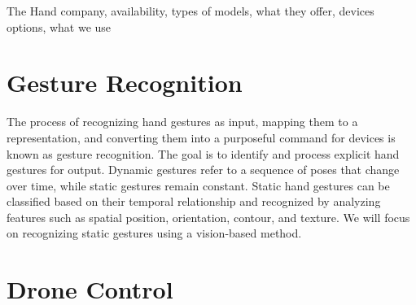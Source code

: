 The Hand 
company, availability, types of models, what they offer, devices options, what we use







\section{Gesture Recognition}

The process of recognizing hand gestures as input, mapping them to a representation, and converting them into a purposeful command for devices is known as gesture recognition. The goal is to identify and process explicit hand gestures for output. 
Dynamic gestures refer to a sequence of poses that change over time, while static gestures remain constant. Static hand gestures can be classified based on their temporal relationship and recognized by analyzing features such as spatial position, orientation, contour, and texture. We will focus on recognizing static gestures using a vision-based method.


\section{Drone Control}



